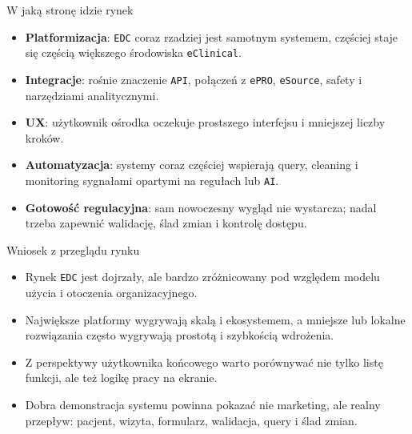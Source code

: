\begin{frame}{W jaką stronę idzie rynek}
  \begin{itemize}
    \item \textbf{Platformizacja}: \texttt{EDC} coraz rzadziej jest samotnym systemem, częściej staje się częścią większego środowiska \texttt{eClinical}.
    \item \textbf{Integracje}: rośnie znaczenie \texttt{API}, połączeń z \texttt{ePRO}, \texttt{eSource}, safety i narzędziami analitycznymi.
    \item \textbf{UX}: użytkownik ośrodka oczekuje prostszego interfejsu i mniejszej liczby kroków.
    \item \textbf{Automatyzacja}: systemy coraz częściej wspierają query, cleaning i monitoring sygnałami opartymi na regułach lub \texttt{AI}.
    \item \textbf{Gotowość regulacyjna}: sam nowoczesny wygląd nie wystarcza; nadal trzeba zapewnić walidację, ślad zmian i kontrolę dostępu.
  \end{itemize}
\end{frame}


\begin{frame}{Wniosek z przeglądu rynku}
  \begin{itemize}
    \item Rynek \texttt{EDC} jest dojrzały, ale bardzo zróżnicowany pod względem modelu użycia i otoczenia organizacyjnego.
    \item Największe platformy wygrywają skalą i ekosystemem, a mniejsze lub lokalne rozwiązania często wygrywają prostotą i szybkością wdrożenia.
    \item Z perspektywy użytkownika końcowego warto porównywać nie tylko listę funkcji, ale też logikę pracy na ekranie.
    \item Dobra demonstracja systemu powinna pokazać nie marketing, ale realny przepływ: pacjent, wizyta, formularz, walidacja, query i ślad zmian.
  \end{itemize}
\end{frame}


